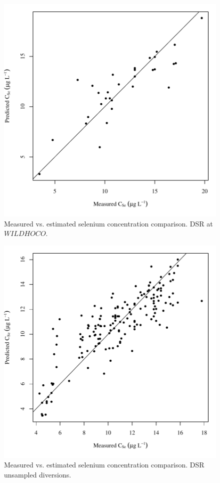 \begin{figure}[htbp]
	\begin{center}
	\includegraphics[width=6in]{"Figures/Results_DSR/Conc Model pred v meas WIL"}
	\caption{Measured vs. estimated selenium concentration comparison.  DSR at $WILDHOCO$.}
	\end{center}
\end{figure}
\newpage

\begin{figure}[htbp]
	\begin{center}
	\includegraphics[width=6in]{"Figures/Results_DSR/Conc Model pred v meas DDIV"}
	\caption{Measured vs. estimated selenium concentration comparison.  DSR unsampled diversions.}
	\end{center}
\end{figure}
\newpage